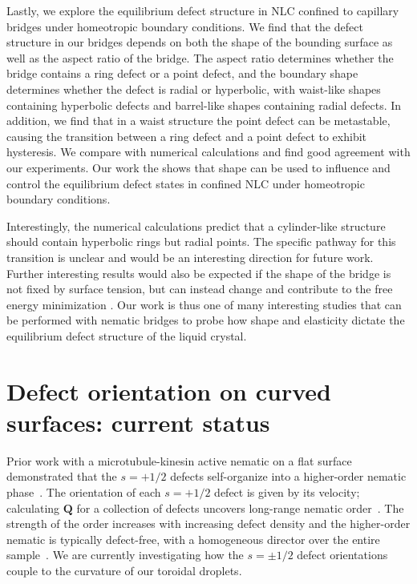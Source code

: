 Lastly, we explore the equilibrium defect structure in NLC confined to capillary bridges under homeotropic boundary conditions.
We find that the defect structure in our bridges depends on both the shape of the bounding surface as well as the aspect ratio of the bridge.
The aspect ratio determines whether the bridge contains a ring defect or a point defect, and the boundary shape determines whether the defect is radial or hyperbolic, with waist-like shapes containing hyperbolic defects and barrel-like shapes containing radial defects.
In addition, we find that in a waist structure the point defect can be metastable, causing the transition between a ring defect and a point defect to exhibit hysteresis.
We compare with numerical calculations and find good agreement with our experiments.
Our work the shows that shape can be used to influence and control the equilibrium defect states in confined NLC under homeotropic boundary conditions.

Interestingly, the numerical calculations predict that a cylinder-like structure should contain hyperbolic rings but radial points.
The specific pathway for this transition is unclear and would be an interesting direction for future work.
Further interesting results would also be expected if the shape of the bridge is not fixed by surface tension, but can instead change and contribute to the free energy minimization \cite{RN12}.
Our work is thus one of many interesting studies that can be performed with nematic bridges to probe how shape and elasticity dictate the equilibrium defect structure of the liquid crystal.

\section{Defect orientation on curved surfaces: current status}
Prior work with a microtubule-kinesin active nematic on a flat surface demonstrated that the $s = +1/2$ defects self-organize into a higher-order nematic phase~\cite{RN27}.
The orientation of each $s = +1/2$ defect is given by its velocity; calculating $\mathbf{Q}$ for a collection of defects uncovers long-range nematic order~\cite{RN27}.
The strength of the order increases with increasing defect density and the higher-order nematic is typically defect-free, with a homogeneous director over the entire sample~\cite{RN27}.
We are currently investigating how the $s = \pm 1/2$ defect orientations couple to the curvature of our toroidal droplets.


